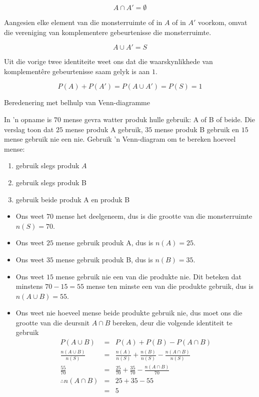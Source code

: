   \[A \cap A' = \emptyset\]


Aangesien elke element van die monsterruimte of in $A$ of in $A'$ voorkom, omvat die vereniging van komplementere gebeurtenisse die monsterruimte.

  \[A \cup A' = S\]


Uit die vorige twee identiteite weet ons dat die waarskynlikhede van komplement\^ere gebeurtenisse saam gelyk is aan $1$.


  \[P(A) + P(A') = P(A \cup A') = P(S) = 1\]



\begin{wex}{Beredenering met belhulp van Venn-diagramme}{
\begin{minipage}{\textwidth}
  In 'n opname is $70$ mense gevra watter produk hulle gebruik: A of B of beide. Die verslag toon dat $25$ mense produk A gebruik, $35$ mense produk B gebruik en $15$ mense gebruik nie een nie. Gebruik 'n Venn-diagram om te bereken hoeveel mense:
  \begin{enumerate}[itemsep=3pt, label=\textbf{\arabic*}.]
\item gebruik slegs produk $A$
  \item gebruik slegs produk B
  \item gebruik beide produk A en produk B
  \end{enumerate}
\end{minipage}
}{
\begin{minipage}{\textwidth}
  \begin{itemize}
  \item Ons weet $70$ mense het deelgeneem, dus is die grootte van die monsterruimte $n(S) = 70$.
  \item Ons weet $25$ mense gebruik produk A, dus is $n(A) = 25$.
  \item Ons weet $35$ mense gebruik produk B, dus is $n(B) = 35$.
  \item Ons weet $15$ mense gebruik nie een van die produkte nie. Dit beteken dat minstens $70-15=55$ mense ten minste een van die produkte gebruik, dus is 
    $n(A \cup B) = 55$.
  \item Ons weet nie hoeveel mense beide produkte gebruik nie, dus moet ons die grootte van die deursnit $A \cap B$ bereken, deur die volgende identiteit te gebruik
    \begin{eqnarray*}
      P(A \cup B) & = & P(A) + P(B) - P(A \cap B) \\
      \frac{n(A \cup B)}{n(S)} & = & \frac{n(A)}{n(S)} + \frac{n(B)}{n(S)} - \frac{n(A \cap B)}{n(S)} \\
      \frac{55}{70} & = & \frac{25}{70} + \frac{35}{70} - \frac{n(A \cap B)}{70} \\
      \therefore n(A \cap B) & = & 25 + 35 - 55 \\
      & = & 5
    \end{eqnarray*}
  \end{itemize}



\end{minipage}}
\end{wex}
